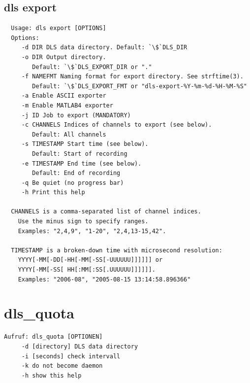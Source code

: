 \documentclass[a4paper,12pt,BCOR6mm,bibtotoc,idxtotoc]{scrbook}
\begin{document}

\subsection{dls export}

\begin{lstlisting} 
  Usage: dls export [OPTIONS] 
  Options: 
     -d DIR DLS data directory. Default: `\$`DLS_DIR
     -o DIR Output directory. 
        Default: `\$`DLS_EXPORT_DIR or "."
     -f NAMEFMT Naming format for export directory. See strftime(3). 
        Default: `\$`DLS_EXPORT_FMT or "dls-export-%Y-%m-%d-%H-%M-%S"
     -a Enable ASCII exporter
     -m Enable MATLAB4 exporter
     -j ID Job to export (MANDATORY)
     -c CHANNELS Indices of channels to export (see below). 
        Default: All channels
     -s TIMESTAMP Start time (see below). 
        Default: Start of recording
     -e TIMESTAMP End time (see below). 
        Default: End of recording
     -q Be quiet (no progress bar)
     -h Print this help 

  CHANNELS is a comma-separated list of channel indices. 
    Use the minus sign to specify ranges. 
    Examples: "2,4,9", "1-20", "2,4,13-15,42".

  TIMESTAMP is a broken-down time with microsecond resolution: 
    YYYY[-MM[-DD[-HH[-MM[-SS[-UUUUUU]]]]]] or
    YYYY[-MM[-SS[ HH[:MM[:SS[.UUUUUU]]]]]]. 
    Examples: "2006-08", "2005-08-15 13:14:58.896366" 
\end{lstlisting}


\section{dls\_quota} \label{sec:apx_cmd_quota} 

\begin{lstlisting} 
Aufruf: dls_quota [OPTIONEN]
     -d [directory] DLS data directory
     -i [seconds] check intervall
     -k do not become daemon
     -h show this help
\end{lstlisting}


\printindex
\end{document}
